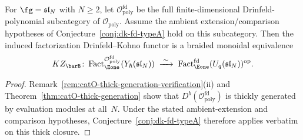 \begin{corollary}
\label{cor:dk-poly-catO}
For $\fg = \mathfrak{sl}_N$ with $N \ge 2$, let
$\mathcal{O}_{\mathrm{poly}}^{\mathrm{fd}}$ be the full
finite-dimensional Drinfeld-polynomial subcategory of
$\mathcal{O}_{\mathrm{poly}}$. Assume the ambient
extension/comparison hypotheses of
Conjecture~\ref{conj:dk-fd-typeA} hold on this subcategory. Then the
induced factorization Drinfeld--Kohno functor is a braided monoidal
equivalence
\[
KZ_{\barB}\colon
\operatorname{Fact}_{\Eone}^{\mathcal{O}_{\mathrm{poly}}^{\mathrm{fd}}}
 (Y_\hbar(\mathfrak{sl}_N))
\;\xrightarrow{\;\sim\;}\;
\operatorname{Fact}_{\Eone}^{\mathrm{fd}}
 (U_q(\mathfrak{sl}_N))^{\mathrm{op}}.
\]
\end{corollary}

\begin{proof}
Remark~\ref{rem:catO-thick-generation-verification}(ii) and
Theorem~\ref{thm:catO-thick-generation} show that
$D^b(\mathcal{O}_{\mathrm{poly}}^{\mathrm{fd}})$ is thickly generated
by evaluation modules at all~$N$. Under the stated ambient-extension
and comparison hypotheses, Conjecture~\ref{conj:dk-fd-typeA}
therefore applies verbatim on this thick closure.
\end{proof}

